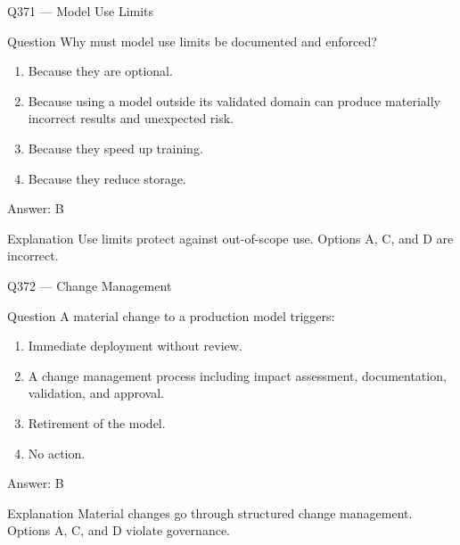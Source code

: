 \documentclass[aspectratio=169,8pt]{beamer}
\begin{document}
	
	\begin{frame}{Q371 --- Model Use Limits}
		\begin{block}{Question}
			Why must model use limits be documented and enforced?
			\begin{enumerate}
				\item Because they are optional.
				\item Because using a model outside its validated domain can produce materially incorrect results and unexpected risk.
				\item Because they speed up training.
				\item Because they reduce storage.
			\end{enumerate}
		\end{block}
		\begin{exampleblock}{Answer: B}\end{exampleblock}
		\begin{block}{Explanation}
			Use limits protect against out-of-scope use. Options A, C, and D are incorrect.
		\end{block}
	\end{frame}
	
	\begin{frame}{Q372 --- Change Management}
		\begin{block}{Question}
			A material change to a production model triggers:
			\begin{enumerate}
				\item Immediate deployment without review.
				\item A change management process including impact assessment, documentation, validation, and approval.
				\item Retirement of the model.
				\item No action.
			\end{enumerate}
		\end{block}
		\begin{exampleblock}{Answer: B}\end{exampleblock}
		\begin{block}{Explanation}
			Material changes go through structured change management. Options A, C, and D violate governance.
		\end{block}
	\end{frame}
	


	

	
\end{document}
